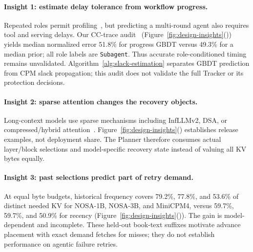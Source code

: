 \paragraph{Insight 1: estimate delay tolerance from workflow progress.}
Repeated roles permit profiling~\cite{yu2026pythia}, but predicting a
multi-round agent also requires tool and serving delays. Our CC-trace
audit~\cite{semianalysis2026cctraces}
(Figure~\ref{fig:design-insights}()) yields median normalized error
51.8\% for progress GBDT versus 49.3\% for a median prior; all role labels
are \texttt{Subagent}. Thus accurate role-conditioned timing remains
unvalidated. Algorithm~\ref{alg:slack-estimation} separates GBDT
prediction from CPM slack propagation; this audit does not validate
the full Tracker or its protection decisions.

\paragraph{Insight 2: sparse attention changes the recovery objects.}
Long-context models use sparse mechanisms including InfLLMv2,
DSA, or compressed/hybrid attention~\cite{minicpm4model,
openbmb2025minicpm41,deepseek2025v32exp,deepseek2025v32model,
zai2026glm5model,openbmb2026sala,deepseek2026v4model,minimax2026m3,
zai2026glm52,longcat2026sparse}.
Figure~\ref{fig:design-insights}()
establishes release examples, not deployment share.
The Planner therefore consumes actual layer/block selections and
model-specific recovery state instead of valuing all KV bytes equally.

\paragraph{Insight 3: past selections predict part of retry demand.}
At equal byte budgets, historical frequency covers 79.2\%, 77.8\%, and
53.6\% of distinct needed KV for NOSA-1B, NOSA-3B, and MiniCPM4,
versus 59.7\%, 59.7\%, and 50.9\% for recency
(Figure~\ref{fig:design-insights}()). The gain is
model-dependent and incomplete. These held-out book-text suffixes
motivate advance placement with exact demand fetches for misses;
they do not establish performance on agentic failure retries.
